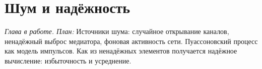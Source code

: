 \chapter{Шум и надёжность}
\label{sec:noise}

\emph{Глава в работе. План:} Источники шума: случайное открывание каналов, ненадёжный выброс медиатора, фоновая активность сети. Пуассоновский процесс как модель импульсов. Как из ненадёжных элементов получается надёжное вычисление: избыточность и усреднение.
